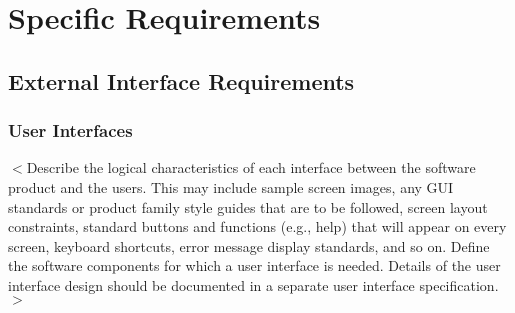\documentclass[a4paper, 11pt]{scrreprt}
\begin{document}
\chapter{Specific Requirements}

\section{External Interface Requirements}
\subsection{User Interfaces}
$<$Describe the logical characteristics of each interface between the software 
product and the users. This may include sample screen images, any GUI standards 
or product family style guides that are to be followed, screen layout 
constraints, standard buttons and functions (e.g., help) that will appear on 
every screen, keyboard shortcuts, error message display standards, and so on.  
Define the software components for which a user interface is needed. Details of 
the user interface design should be documented in a separate user interface 
specification.$>$
\end{document}
